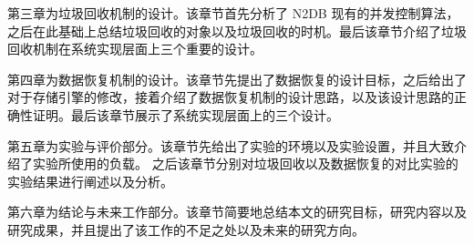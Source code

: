 第三章为垃圾回收机制的设计。该章节首先分析了 N2DB 现有的并发控制算法，之后在此基础上总结垃圾回收的对象以及垃圾回收的时机。最后该章节介绍了垃圾回收机制在系统实现层面上三个重要的设计。

第四章为数据恢复机制的设计。该章节先提出了数据恢复的设计目标，之后给出了对于存储引擎的修改，接着介绍了数据恢复机制的设计思路，以及该设计思路的正确性证明。最后该章节展示了系统实现层面上的三个设计。

第五章为实验与评价部分。该章节先给出了实验的环境以及实验设置，并且大致介绍了实验所使用的负载。
之后该章节分别对垃圾回收以及数据恢复的对比实验的实验结果进行阐述以及分析。

第六章为结论与未来工作部分。该章节简要地总结本文的研究目标，研究内容以及研究成果，并且提出了该工作的不足之处以及未来的研究方向。


